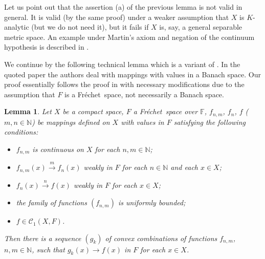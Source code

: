 \documentclass{amsart}
\numberwithin{equation}{section}
\newtheorem{lemma}[thm]{Lemma}
\theoremstyle{definition}
\def\C{\mathcal C}
\def\en{\mathbb N}
\def\ef{\mathbb F}
\newcommand{\fr}{Fr\'echet\ }
\begin{document}
Let us point out that the assertion (a) of the previous lemma is not valid in general. It is valid (by the same proof) under a weaker assumption that $X$ is $K$-analytic (but we do not need it), but it fails if $X$ is, say, a general separable metric space. An example under Martin's axiom and negation of the continuum hypothesis is described in \cite[Example 2.4(3)]{koumou}.

We continue by the following technical lemma which is a variant of \cite[Proposition 2.8]{MeSta}. In the quoted paper the authors deal with mappings with values in a Banach space. Our proof essentially follows the proof in \cite{MeSta} with necessary modifications due to the assumption that $F$ is a \fr space, not necessarily a Banach space.

\begin{lemma}\label{L:c21}
Let $X$ be a compact space, $F$ a \fr space over $\ef$, $f_{n,m}$, $f_n$, $f$ ($m,n\in\en$) be mappings defined on $X$ with values in $F$ satisfying the following conditions:
\begin{itemize}
	\item[(i)] $f_{n,m}$ is continuous on $X$ for each $n,m\in\en$;
	\item[(ii)] $f_{n,m}(x)\overset{m}{\longrightarrow}f_n(x)$ weakly in $F$ for each $n\in\en$ and each $x\in X$;
	\item[(iii)] $f_{n}(x)\overset{n}{\longrightarrow}f(x)$ weakly in $F$ for each $x\in X$;
	\item[(iv)] the family of functions $(f_{n,m})$ is uniformly bounded;
	\item[(v)] $f\in\C_1(X,F)$.
\end{itemize}
Then there is a sequence $(g_k)$ of convex combinations of functions $f_{n,m}$, $n,m\in\en$, such that $g_k(x)\to f(x)$
in $F$ for each $x\in X$.
\end{lemma}
\end{document}
